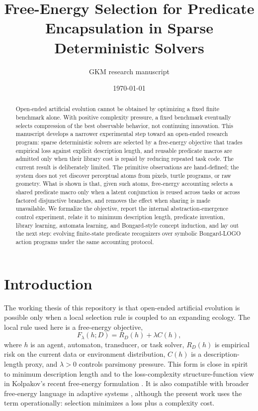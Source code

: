 \documentclass[11pt]{article}
\title{Free-Energy Selection for Predicate Encapsulation in Sparse Deterministic Solvers}
\author{GKM research manuscript}
\date{\today}
\begin{document}
\maketitle

\begin{abstract}
Open-ended artificial evolution cannot be obtained by optimizing a fixed finite
benchmark alone. With positive complexity pressure, a fixed benchmark eventually
selects compression of the best observable behavior, not continuing innovation.
This manuscript develops a narrower experimental step toward an open-ended
research program: sparse deterministic solvers are selected by a free-energy
objective that trades empirical loss against explicit description length, and
reusable predicate macros are admitted only when their library cost is repaid by
reducing repeated task code. The current result is deliberately limited. The
primitive observations are hand-defined; the system does not yet discover
perceptual atoms from pixels, turtle programs, or raw geometry. What is shown is
that, given such atoms, free-energy accounting selects a shared predicate macro
only when a latent conjunction is reused across tasks or across factored
disjunctive branches, and removes the effect when sharing is made unavailable.
We formalize the objective, report the internal abstraction-emergence control
experiment, relate it to minimum description length, predicate invention,
library learning, automata learning, and Bongard-style concept induction, and
lay out the next step: evolving finite-state predicate recognizers over
symbolic Bongard-LOGO action programs under the same accounting protocol.
\end{abstract}

\section{Introduction}

The working thesis of this repository is that open-ended artificial evolution is
possible only when a local selection rule is coupled to an expanding ecology.
The local rule used here is a free-energy objective,
\begin{equation}
  F_{\lambda}(h;D)=R_D(h)+\lambda C(h),
  \label{eq:basic-free-energy}
\end{equation}
where $h$ is an agent, automaton, transducer, or task solver, $R_D(h)$ is
empirical risk on the current data or environment distribution, $C(h)$ is a
description-length proxy, and $\lambda>0$ controls parsimony pressure. This form
is close in spirit to minimum description length \cite{rissanen1978modeling,
grunwald2007minimum,grunwaldroos2019mdl} and to the loss-complexity
structure-function view in Kolpakov's recent free-energy formulation
\cite{kolpakov2025loss}. It is also compatible with broader free-energy
language in adaptive systems \cite{friston2010free}, although the present work
uses the term operationally: selection minimizes a loss plus a complexity cost.
\end{document}
